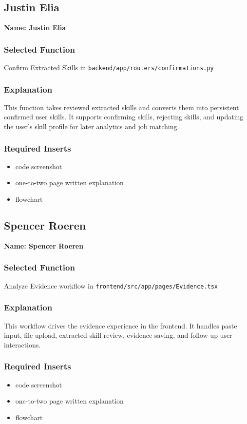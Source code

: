 \documentclass[11pt]{article}
\begin{document}
\subsection{Justin Elia}
\textbf{Name: Justin Elia}

\subsubsection{Selected Function}
Confirm Extracted Skills in \texttt{backend/app/routers/confirmations.py}

\subsubsection{Explanation}
This function takes reviewed extracted skills and converts them into persistent confirmed user skills. It supports confirming skills, rejecting skills, and updating the user's skill profile for later analytics and job matching.

\subsubsection{Required Inserts}
\begin{itemize}[leftmargin=1.25em]
  \item code screenshot
  \item one-to-two page written explanation
  \item flowchart
\end{itemize}

\subsection{Spencer Roeren}
\textbf{Name: Spencer Roeren}

\subsubsection{Selected Function}
Analyze Evidence workflow in \texttt{frontend/src/app/pages/Evidence.tsx}

\subsubsection{Explanation}
This workflow drives the evidence experience in the frontend. It handles paste input, file upload, extracted-skill review, evidence saving, and follow-up user interactions.

\subsubsection{Required Inserts}
\begin{itemize}[leftmargin=1.25em]
  \item code screenshot
  \item one-to-two page written explanation
  \item flowchart
\end{itemize}
\end{document}
